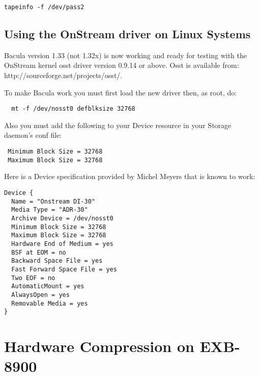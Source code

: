\footnotesize
\begin{verbatim}
tapeinfo -f /dev/pass2
\end{verbatim}
\normalsize

\label{onstream}

\subsection{Using the OnStream driver on Linux Systems}

Bacula version 1.33 (not 1.32x) is now working and ready for testing with the
OnStream kernel osst driver version 0.9.14 or above. Osst is available from:
{http://sourceforge.net/projects/osst/}.

To make Bacula work you must first load the new driver then, as root, do:

\footnotesize
\begin{verbatim}
  mt -f /dev/nosst0 defblksize 32768
\end{verbatim}
\normalsize

Also you must add the following to your Device resource in your Storage
daemon's conf file:

\footnotesize
\begin{verbatim}
 Minimum Block Size = 32768
 Maximum Block Size = 32768
\end{verbatim}
\normalsize

Here is a Device specification provided by Michel Meyers that is known to
work:

\footnotesize
\begin{verbatim}
Device {
  Name = "Onstream DI-30"
  Media Type = "ADR-30"
  Archive Device = /dev/nosst0
  Minimum Block Size = 32768
  Maximum Block Size = 32768
  Hardware End of Medium = yes
  BSF at EOM = no
  Backward Space File = yes
  Fast Forward Space File = yes
  Two EOF = no
  AutomaticMount = yes
  AlwaysOpen = yes
  Removable Media = yes
}
\end{verbatim}
\normalsize

\section{Hardware Compression on EXB-8900}

